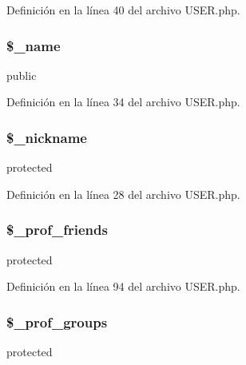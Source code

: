 Definición en la línea 40 del archivo U\-S\-E\-R.\-php.

\hypertarget{classUSER_a1c89defaf5aa7ac8e526065e8572f580}{
\subsubsection[{\$\-\_\-name}]{\setlength{\rightskip}{0pt plus 5cm}\$\-\_\-name}}\label{classUSER_a1c89defaf5aa7ac8e526065e8572f580}
public 

Definición en la línea 34 del archivo U\-S\-E\-R.\-php.

\hypertarget{classUSER_a0791a0cc4f4f4676e8f4f94ba0516731}{
\subsubsection[{\$\-\_\-nickname}]{\setlength{\rightskip}{0pt plus 5cm}\$\-\_\-nickname\hspace{0.3cm}{\ttfamily [protected]}}}\label{classUSER_a0791a0cc4f4f4676e8f4f94ba0516731}
protected 

Definición en la línea 28 del archivo U\-S\-E\-R.\-php.

\hypertarget{classUSER_aaa568e34fed9cc0bbd396dd4e5bb5958}{
\subsubsection[{\$\-\_\-prof\-\_\-friends}]{\setlength{\rightskip}{0pt plus 5cm}\$\-\_\-prof\-\_\-friends\hspace{0.3cm}{\ttfamily [protected]}}}\label{classUSER_aaa568e34fed9cc0bbd396dd4e5bb5958}
protected 

Definición en la línea 94 del archivo U\-S\-E\-R.\-php.

\hypertarget{classUSER_a5f31de3c7150ec160bd0cee74d71bb0a}{
\subsubsection[{\$\-\_\-prof\-\_\-groups}]{\setlength{\rightskip}{0pt plus 5cm}\$\-\_\-prof\-\_\-groups\hspace{0.3cm}{\ttfamily [protected]}}}\label{classUSER_a5f31de3c7150ec160bd0cee74d71bb0a}
protected 

